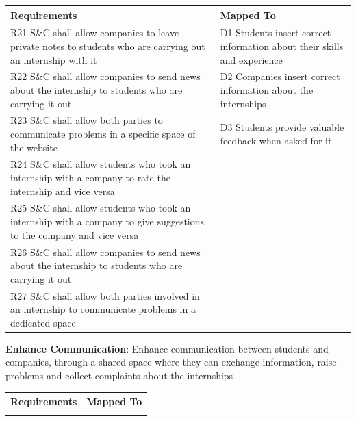 \begin{enumerate}[label={[G\arabic*]}]
\begin{longtable}{|p{8cm}|p{8cm}|}
\hline
\rowcolor[HTML]{CFE2F3} 
\textbf{Requirements} & \textbf{Mapped To} \\
\hline
\endfirsthead

\hline
\endfoot

\hline
\endlastfoot
R21 S\&C shall allow companies to leave private notes to students who are carrying out an internship with it & D1 Students insert correct information about their skills and experience \\
R22 S\&C shall allow companies to send news about the internship to students who are carrying it out & D2 Companies insert correct information about the internships \\
R23 S\&C shall allow both parties to communicate problems in a specific space of the website & D3 Students provide valuable feedback when asked for it \\
R24 S\&C shall allow students who took an internship with a company to rate the internship and vice versa & \\
R25 S\&C shall allow students who took an internship with a company to give suggestions to the company and vice versa & \\
R26 S\&C shall allow companies to send news about the internship to students who are carrying it out & \\
R27 S\&C shall allow both parties involved in an internship to communicate problems in a dedicated space & \\

\end{longtable}
\item \textbf{Enhance Communication}: 
                Enhance communication between students and companies, through a shared space where they can exchange information, raise problems and collect complaints about the internships

\begin{longtable}{|p{8cm}|p{8cm}|}
\hline
\rowcolor[HTML]{CFE2F3} 
\textbf{Requirements} & \textbf{Mapped To} \\
\hline
\endfirsthead

\hline
\endfoot


\end{longtable}
\end{enumerate}
